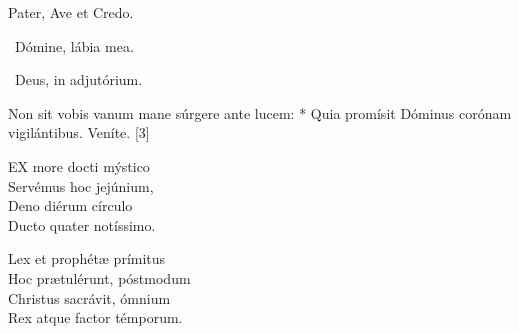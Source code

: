 \sectionornament





Pater, Ave et Credo.

\V\ Dómine, lábia mea.

\V\ Deus, in adjutórium.



 Non sit vobis vanum mane súrgere ante lucem: * Quia promísit Dóminus corónam vigilántibus.  Veníte. [3]


\lettrine[lines=2]{E}{X} more docti mýstico\\
Servémus hoc jejúnium,\\
Deno diérum círculo\\
Ducto quater notíssimo.

Lex et prophétæ prímitus\\
Hoc prætulérunt, póstmodum\\
Christus sacrávit, ómnium\\
Rex atque factor témporum.

